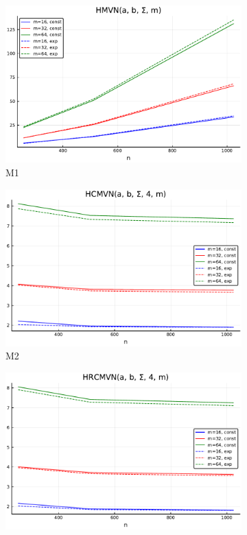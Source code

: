 \begin{figure}
	\centering
			\begin{subfigure}[b]{0.3\textwidth}
					\centering
					\includegraphics[width=\linewidth]{figs/table3_m1.pdf}
					\caption{M1}
			\end{subfigure}\hfill
			\begin{subfigure}[b]{0.3\textwidth}
					\centering
					\includegraphics[width=\linewidth]{figs/table3_m2.pdf}
					\caption{M2}
			\end{subfigure}\hfill
			\begin{subfigure}[b]{0.3\textwidth}
					\centering
					\includegraphics[width=\linewidth]{figs/table3_m3.pdf}

\end{subfigure}
\end{figure}
